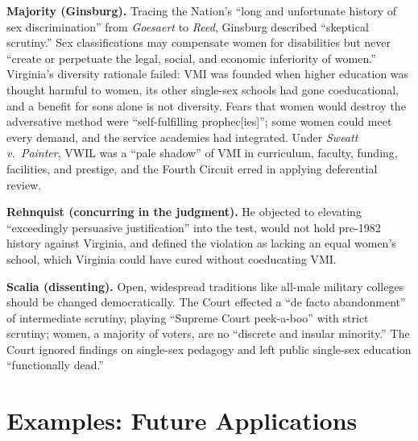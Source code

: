 \documentclass[12pt]{article}
\begin{document}
\textbf{Majority (Ginsburg).} Tracing the Nation's ``long and unfortunate history of sex discrimination'' from \textit{Goesaert} to \textit{Reed}, Ginsburg described ``skeptical scrutiny.'' Sex classifications may compensate women for disabilities but never ``create or perpetuate the legal, social, and economic inferiority of women.'' Virginia's diversity rationale failed: VMI was founded when higher education was thought harmful to women, its other single-sex schools had gone coeducational, and a benefit for sons alone is not diversity. Fears that women would destroy the adversative method were ``self-fulfilling prophec[ies]''; some women could meet every demand, and the service academies had integrated. Under \textit{Sweatt v.\ Painter}, VWIL was a ``pale shadow'' of VMI in curriculum, faculty, funding, facilities, and prestige, and the Fourth Circuit erred in applying deferential review.

\textbf{Rehnquist (concurring in the judgment).} He objected to elevating ``exceedingly persuasive justification'' into the test, would not hold pre-1982 history against Virginia, and defined the violation as lacking an equal women's school, which Virginia could have cured without coeducating VMI.

\textbf{Scalia (dissenting).} Open, widespread traditions like all-male military colleges should be changed democratically. The Court effected a ``de facto abandonment'' of intermediate scrutiny, playing ``Supreme Court peek-a-boo'' with strict scrutiny; women, a majority of voters, are no ``discrete and insular minority.'' The Court ignored findings on single-sex pedagogy and left public single-sex education ``functionally dead.''

\section{Examples: Future Applications}
\end{document}
